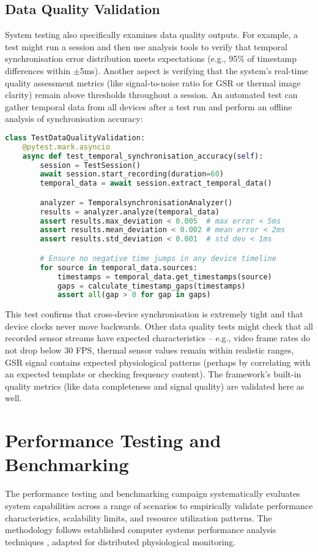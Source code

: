 \documentclass[11pt,a4paper]{report}
\begin{document}
\subsection{Data Quality Validation}
System testing also specifically examines data quality outputs. For example, a test might run a session and then use analysis tools to verify that temporal synchronisation error distribution meets expectations (e.g., 95\% of timestamp differences within $\pm$5ms). Another aspect is verifying that the system’s real-time quality assessment metrics (like signal-to-noise ratio for GSR or thermal image clarity) remain above thresholds throughout a session.
An automated test can gather temporal data from all devices after a test run and perform an offline analysis of synchronisation accuracy:
\begin{lstlisting}[language=Python]
class TestDataQualityValidation:
    @pytest.mark.asyncio
    async def test_temporal_synchronisation_accuracy(self):
        session = TestSession()
        await session.start_recording(duration=60)
        temporal_data = await session.extract_temporal_data()

        analyzer = TemporalsynchronisationAnalyzer()
        results = analyzer.analyze(temporal_data)
        assert results.max_deviation < 0.005  # max error < 5ms
        assert results.mean_deviation < 0.002 # mean error < 2ms
        assert results.std_deviation < 0.001  # std dev < 1ms

        # Ensure no negative time jumps in any device timeline
        for source in temporal_data.sources:
            timestamps = temporal_data.get_timestamps(source)
            gaps = calculate_timestamp_gaps(timestamps)
            assert all(gap > 0 for gap in gaps)
\end{lstlisting}
This test confirms that cross-device synchronisation is extremely tight and that device clocks never move backwards.
Other data quality tests might check that all recorded sensor streams have expected characteristics – e.g., video frame rates do not drop below 30 FPS, thermal sensor values remain within realistic ranges, GSR signal contains expected physiological patterns (perhaps by correlating with an expected template or checking frequency content). The framework’s built-in quality metrics (like data completeness and signal quality) are validated here as well.
\section{Performance Testing and Benchmarking}
The performance testing and benchmarking campaign systematically evaluates system capabilities across a range of scenarios to empirically validate performance characteristics, scalability limits, and resource utilization patterns. The methodology follows established computer systems performance analysis techniques \cite{Jain1990}, adapted for distributed physiological monitoring.
\end{document}
